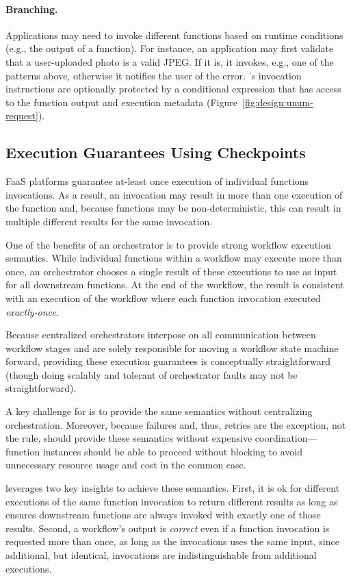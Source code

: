 \paragraph{Branching.}
Applications may need to invoke different functions based on runtime conditions
(e.g., the output of a function). For instance, an application may first
validate that a user-uploaded photo is a valid JPEG. If it is, it invokes, e.g.,
one of the patterns above, otherwise it notifies the user of the error.
\name{}'s invocation instructions are optionally protected by a conditional
expression that has access to the function output and execution metadata
(Figure~\ref{fig:design:unum-request}).

\subsection{Execution Guarantees Using Checkpoints}\label{sec:design:execution}

FaaS platforms guarantee at-least once execution of individual functions
invocations. As a result, an invocation may result in more than one execution of
the function and, because functions may be non-deterministic, this can result in
multiple different results for the same invocation.

One of the benefits of an orchestrator is to provide strong workflow execution
semantics. While individual functions within a workflow may execute more than
once, an orchestrator chooses a single result of these executions to use as
input for all downstream functions. At the end of the workflow, the result is
consistent with an execution of the workflow where each function invocation
executed \emph{exactly-once}.

Because centralized orchestrators interpose on all communication between
workflow stages and are solely responsible for moving a workflow state machine
forward, providing these execution guarantees is conceptually straightforward
(though doing scalably and tolerant of orchestrator faults may not be
straightforward).

A key challenge for \name{} is to provide the same semantics without
centralizing orchestration. Moreover, because failures and, thus, retries are
the exception, not the rule, \name{} should provide these semantics without
expensive coordination---function instances should be able to proceed without
blocking to avoid unnecessary resource usage and cost in the common case.

\name{} leverages two key insights to achieve these semantics.  First, it is ok
for different executions of the same function invocation to return different
results as long as \name{} ensures downstream functions are always invoked with
exactly one of those results. Second, a workflow's output is \emph{correct} even
if a function invocation is requested more than once, as long as the invocations
uses the same input, since additional, but identical, invocations are
indistinguishable from additional executions.

